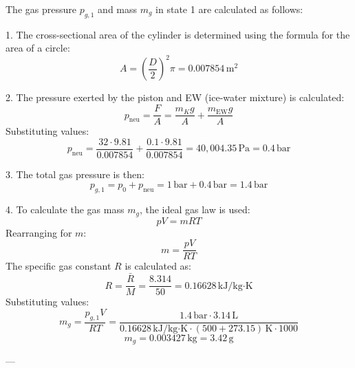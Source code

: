 The gas pressure \( p_{g,1} \) and mass \( m_g \) in state 1 are calculated as follows:

1. The cross-sectional area of the cylinder is determined using the formula for the area of a circle:  
\[
A = \left( \frac{D}{2} \right)^2 \pi = 0.007854 \, \text{m}^2
\]

2. The pressure exerted by the piston and EW (ice-water mixture) is calculated:  
\[
p_{\text{neu}} = \frac{F}{A} = \frac{m_K g}{A} + \frac{m_{\text{EW}} g}{A}
\]  
Substituting values:  
\[
p_{\text{neu}} = \frac{32 \cdot 9.81}{0.007854} + \frac{0.1 \cdot 9.81}{0.007854} = 40,004.35 \, \text{Pa} = 0.4 \, \text{bar}
\]

3. The total gas pressure is then:  
\[
p_{g,1} = p_0 + p_{\text{neu}} = 1 \, \text{bar} + 0.4 \, \text{bar} = 1.4 \, \text{bar}
\]

4. To calculate the gas mass \( m_g \), the ideal gas law is used:  
\[
p V = m R T
\]  
Rearranging for \( m \):  
\[
m = \frac{p V}{R T}
\]  
The specific gas constant \( R \) is calculated as:  
\[
R = \frac{\bar{R}}{M} = \frac{8.314}{50} = 0.16628 \, \text{kJ/kg·K}
\]  
Substituting values:  
\[
m_g = \frac{p_{g,1} V}{R T} = \frac{1.4 \, \text{bar} \cdot 3.14 \, \text{L}}{0.16628 \, \text{kJ/kg·K} \cdot (500 + 273.15) \, \text{K} \cdot 1000}
\]  
\[
m_g = 0.003427 \, \text{kg} = 3.42 \, \text{g}
\]

---